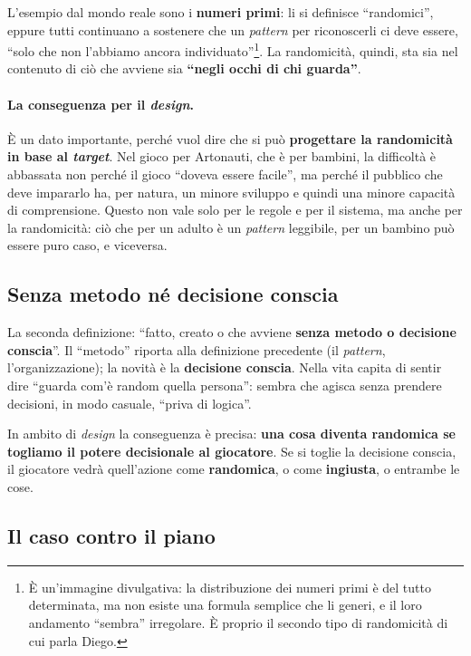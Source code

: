 L'esempio dal mondo reale sono i \textbf{numeri primi}: li si definisce ``randomici'', eppure
tutti continuano a sostenere che un \emph{pattern} per riconoscerli ci deve essere, ``solo che
non l'abbiamo ancora individuato''\footnote{È un'immagine divulgativa: la distribuzione dei
numeri primi è del tutto determinata, ma non esiste una formula semplice che li generi, e il
loro andamento ``sembra'' irregolare. È proprio il secondo tipo di randomicità di cui parla
Diego.}. La randomicità, quindi, sta sia nel contenuto di ciò che avviene sia
\textbf{``negli occhi di chi guarda''}.

\paragraph{La conseguenza per il \emph{design}.} È un dato importante, perché vuol dire che
si può \textbf{progettare la randomicità in base al \emph{target}}. Nel gioco per Artonauti,
che è per bambini, la difficoltà è abbassata non perché il gioco ``doveva essere facile'', ma
perché il pubblico che deve impararlo ha, per natura, un minore sviluppo e quindi una minore
capacità di comprensione. Questo non vale solo per le regole e per il sistema, ma anche per
la randomicità: ciò che per un adulto è un \emph{pattern} leggibile, per un bambino può
essere puro caso, e viceversa.

\subsection{Senza metodo né decisione conscia}

La seconda definizione: ``fatto, creato o che avviene \textbf{senza metodo o decisione
conscia}''. Il ``metodo'' riporta alla definizione precedente (il \emph{pattern},
l'organizzazione); la novità è la \textbf{decisione conscia}. Nella vita capita di sentir
dire ``guarda com'è random quella persona'': sembra che agisca senza prendere decisioni, in
modo casuale, ``priva di logica''.

In ambito di \emph{design} la conseguenza è precisa: \textbf{una cosa diventa randomica se
togliamo il potere decisionale al giocatore}. Se si toglie la decisione conscia, il
giocatore vedrà quell'azione come \textbf{randomica}, o come \textbf{ingiusta}, o entrambe le
cose.

\subsection{Il caso contro il piano}

